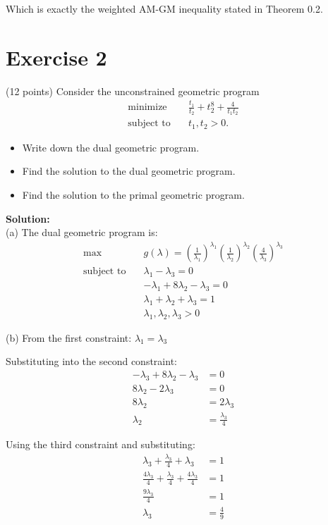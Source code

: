\documentclass{article}
\begin{document}
Which is exactly the weighted AM-GM inequality stated in Theorem 0.2.

\newpage

\section*{Exercise 2}
(12 points) Consider the unconstrained geometric program
\begin{align*}
\text{minimize} \quad & \frac{t_1}{t_2} + t_2^8 + \frac{4}{t_1 t_2} \\
\text{subject to} \quad & t_1, t_2 > 0.
\end{align*}

\begin{itemize}
    \item[(a)] Write down the dual geometric program.
    \item[(b)] Find the solution to the dual geometric program.
    \item[(c)] Find the solution to the primal geometric program.
\end{itemize}

\textbf{Solution:} \\

(a) The dual geometric program is:
\begin{align*}
\max \quad & g(\lambda) = \left(\frac{1}{\lambda_1}\right)^{\lambda_1} \left(\frac{1}{\lambda_2}\right)^{\lambda_2} \left(\frac{4}{\lambda_3}\right)^{\lambda_3} \\
\text{subject to} \quad & \lambda_1 - \lambda_3 = 0 \\
& -\lambda_1 + 8\lambda_2 - \lambda_3 = 0 \\
& \lambda_1 + \lambda_2 + \lambda_3 = 1 \\
& \lambda_1, \lambda_2, \lambda_3 > 0
\end{align*}

(b) From the first constraint: $\lambda_1 = \lambda_3$

Substituting into the second constraint:
\begin{align*}
-\lambda_3 + 8\lambda_2 - \lambda_3 &= 0\\
8\lambda_2 - 2\lambda_3 &= 0\\
8\lambda_2 &= 2\lambda_3\\
\lambda_2 &= \frac{\lambda_3}{4}
\end{align*}

Using the third constraint and substituting:
\begin{align*}
\lambda_3 + \frac{\lambda_3}{4} + \lambda_3 &= 1\\
\frac{4\lambda_3}{4} + \frac{\lambda_3}{4} + \frac{4\lambda_3}{4} &= 1\\
\frac{9\lambda_3}{4} &= 1\\
\lambda_3 &= \frac{4}{9}
\end{align*}
\end{document}
